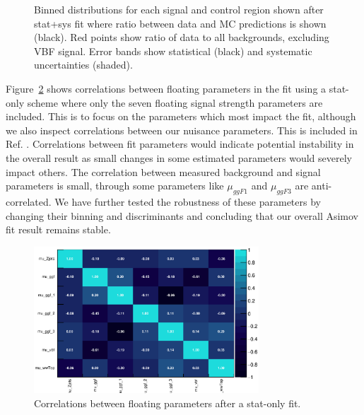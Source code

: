\begin{figure}[!h]
{  }\hfill
  \hfill
{\caption{Binned distributions for each signal and control region shown after stat+sys fit where ratio between data and MC predictions is shown (black). Red points show ratio of data to all backgrounds, excluding VBF signal. Error bands show statistical (black) and systematic uncertainties (shaded).}
\label{fig:fitresultsregions}}
\end{figure}

Figure~\ref{fig:correlations} shows correlations between floating parameters in the fit using a stat-only scheme where only the seven floating signal strength parameters are included. This is to focus on the parameters which most impact the fit, although we also inspect correlations between our nuisance parameters. This is included in Ref. \cite{ourSupportNote}. Correlations between fit parameters would indicate potential instability in the overall result as small changes in some estimated parameters would severely impact others. The correlation between measured background and signal parameters is small, through some parameters like $\mu_{ggF1}$ and $\mu_{ggF3}$ are anti-correlated. We have further tested the robustness of these parameters by changing their binning and discriminants and concluding that our overall Asimov fit result remains stable.  

\begin{figure}[!h]
\centering
\includegraphics[width=0.75\textwidth]{Pictures/fitresults/correlation_stat.eps}
\caption{Correlations between floating parameters after a stat-only fit.}
\label{fig:correlations}
\end{figure}

